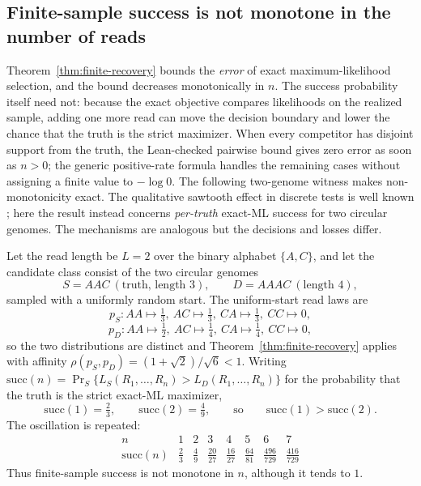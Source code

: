 \subsection{Finite-sample success is not monotone in the number of reads}
\label{sec:nonmonotone}

Theorem~\ref{thm:finite-recovery} bounds the \emph{error} of exact
maximum-likelihood selection, and the bound decreases monotonically in $n$.
The success probability itself need not: because the exact objective compares
likelihoods on the realized sample, adding one more read can move the decision
boundary and lower the chance that the truth is the strict maximizer. When every
competitor has disjoint support from the truth, the Lean-checked pairwise bound
gives zero error as soon as $n>0$; the generic positive-rate formula handles
the remaining cases without assigning a finite value to $-\log 0$. The
following two-genome witness makes non-monotonicity exact. The qualitative
sawtooth effect in discrete tests is well known
\parencite{chernick2002}; here the result instead concerns
\emph{per-truth} exact-ML success for two circular genomes.
The mechanisms are analogous but the decisions and losses differ.

\begin{proposition}
\label{prop:nonmonotone}
Let the read length be $L=2$ over the binary alphabet $\{A,C\}$, and let the
candidate class consist of the two circular genomes
\[
  S = AAC \ (\text{truth, length }3), \qquad D = AAAC \ (\text{length }4),
\]
sampled with a uniformly random start. The uniform-start read laws are
\[
  p_S : AA\mapsto \tfrac13,\ AC\mapsto \tfrac13,\ CA\mapsto \tfrac13,\ CC\mapsto 0,
\]
\[
  p_D : AA\mapsto \tfrac12,\ AC\mapsto \tfrac14,\ CA\mapsto \tfrac14,\ CC\mapsto 0,
\]
so the two distributions are distinct and Theorem~\ref{thm:finite-recovery}
applies with affinity $\rho(p_S,p_D) = (1+\sqrt2)/\sqrt6 < 1$. Writing
$\mathrm{succ}(n)=\Pr_S\{L_S(R_1,\dots,R_n) > L_D(R_1,\dots,R_n)\}$ for the
probability that the truth is the strict exact-ML maximizer,
\[
  \mathrm{succ}(1) = \tfrac23, \qquad \mathrm{succ}(2) = \tfrac49,
  \qquad\text{so}\qquad \mathrm{succ}(1) > \mathrm{succ}(2).
\]
The oscillation is repeated:
\[
\begin{array}{c|rrrrrrr}
n & 1&2&3&4&5&6&7\\ \hline
\mathrm{succ}(n)&\frac23&\frac49&\frac{20}{27}&\frac{16}{27}&
\frac{64}{81}&\frac{496}{729}&\frac{416}{729}
\end{array}
\]
Thus finite-sample success is not monotone in $n$, although it tends to $1$.
\end{proposition}

